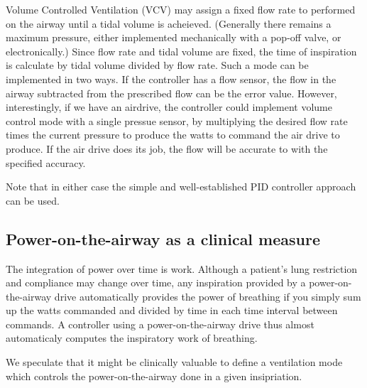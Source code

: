 \documentclass{article}
\begin{document}
Volume Controlled Ventilation (VCV) may assign a fixed flow rate to
performed on the airway until a tidal volume is acheieved.
(Generally there remains
a maximum pressure, either implemented mechanically with a pop-off valve,
or electronically.)
Since
flow rate and tidal volume are fixed, the time of inspiration
is calculate by tidal volume divided by flow rate.
Such a mode can be implemented in two ways. If the controller
has a flow sensor, the flow in the airway subtracted from the
prescribed flow can be the error value. However, interestingly, if
we have an airdrive, the controller could implement volume control mode with a single
pressue sensor, by multiplying the desired flow rate times the current pressure
to produce the watts to command the air drive to produce. If the air drive does its
job, the flow will be accurate to with the specified accuracy.

Note that in either case the simple and well-established PID controller
approach can be used.

\subsection{Power-on-the-airway as a clinical measure}

The integration of power over time is work. Although a patient's
lung restriction and compliance may change over time, any inspiration
provided by a power-on-the-airway drive automatically provides
the power of breathing if you simply sum up the watts commanded
and divided by time in each time interval between commands.
A controller using a power-on-the-airway drive thus almost
automaticaly computes the inspiratory work of breathing.

We speculate that it might be clinically valuable to
define a ventilation mode which controls the power-on-the-airway
done in a given insipriation.





\end{document}
